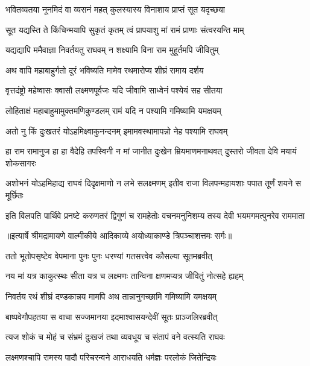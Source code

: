 \twolineshloka
{भवितव्यतया नूनमिदं वा व्यसनं महत्}
{कुलस्यास्य विनाशाय प्राप्तं सूत यदृच्छया} %

\twolineshloka
{सूत यद्यस्ति ते किंचिन्मयापि सुकृतं कृतम्}
{त्वं प्रापयाशु मां रामं प्राणाः संत्वरयन्ति माम्} %

\twolineshloka
{यद्यद्यापि ममैवाज्ञा निवर्तयतु राघवम्}
{न शक्ष्यामि विना राम मुहूर्तमपि जीवितुम्} %

\twolineshloka
{अथ वापि महाबाहुर्गतो दूरं भविष्यति}
{मामेव रथमारोप्य शीघ्रं रामाय दर्शय} %

\twolineshloka
{वृत्तदंष्ट्रो महेष्वासः क्वासौ लक्ष्मणपूर्वजः}
{यदि जीवामि साध्वेनं पश्येयं सह सीतया} %

\twolineshloka
{लोहिताक्षं महाबाहुमामुक्तमणिकुण्डलम्}
{रामं यदि न पश्यामि गमिष्यामि यमक्षयम्} %

\twolineshloka
{अतो नु किं दुःखतरं योऽहमिक्ष्वाकुनन्दनम्}
{इमामवस्थामापन्नो नेह पश्यामि राघवम्} %

\threelineshloka
{हा राम रामानुज हा हा वैदेहि तपस्विनी}
{न मां जानीत दुःखेन म्रियमाणमनाथवत्}
{दुस्तरो जीवता देवि मयायं शोकसागरः} %

\fourlineindentedshloka
{अशोभनं योऽहमिहाद्य राघवं}
{ दिदृक्षमाणो न लभे सलक्ष्मणम्}
{इतीव राजा विलपन्महायशाः}
{ पपात तूर्णं शयने स मूर्छितः} %

\fourlineindentedshloka
{इति विलपति पार्थिवे प्रनष्टे}
{ करुणतरं द्विगुणं च रामहेतोः}
{वचनमनुनिशम्य तस्य देवी}
{ भयमगमत्पुनरेव राममाता} %


{॥इत्यार्षे श्रीमद्रामायणे वाल्मीकीये आदिकाव्ये अयोध्याकाण्डे त्रिपञ्चाशत्तमः सर्गः॥}


\twolineshloka
{ततो भूतोपसृष्टेव वेपमाना पुनः पुनः}
{धरण्यां गतसत्त्वेव कौसल्या सूतमब्रवीत्} %

\twolineshloka
{नय मां यत्र काकुत्स्थः सीता यत्र च लक्ष्मणः}
{तान्विना क्षणमप्यत्र जीवितुं नोत्सहे ह्यहम्} %

\twolineshloka
{निवर्तय रथं शीघ्रं दण्डकान्नय मामपि}
{अथ तान्नानुगच्छामि गमिष्यामि यमक्षयम्} %

\twolineshloka
{बाष्पवेगौपहतया स वाचा सज्जमानया}
{इदमाश्वासयन्देवीं सूतः प्राञ्जलिरब्रवीत्} %

\twolineshloka
{त्यज शोकं च मोहं च संभ्रमं दुःखजं तथा}
{व्यवधूय च संतापं वने वत्स्यति राघवः} %

\twolineshloka
{लक्ष्मणश्चापि रामस्य पादौ परिचरन्वने}
{आराधयति धर्मज्ञः परलोकं जितेन्द्रियः} %

